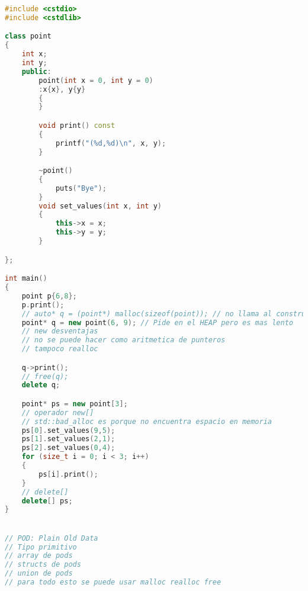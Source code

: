 \begin{lstlisting}[language=C++, caption={Herencia 2}]
#include <cstdio>
#include <cstdlib>

class point
{
    int x;
    int y;
    public:
        point(int x = 0, int y = 0)
        :x{x}, y{y}
        {
        }

        void print() const
        {
            printf("(%d,%d)\n", x, y);
        }

        ~point()
        {
            puts("Bye");
        }
        void set_values(int x, int y)
        {
            this->x = x;
            this->y = y;
        }

};

int main()
{
    point p{6,8};
    p.print();
    // auto* q = (point*) malloc(sizeof(point)); // no llama al constructor por lo que no sirve
    point* q = new point(6, 9); // Pide en el HEAP pero es mas lento
    // new desventajas
    // no se puede hacer como aritmetica de punteros
    // tampoco realloc

    q->print();
    // free(q);
    delete q;

    point* ps = new point[3];
    // operador new[]
    // std::bad_alloc es porque no encuentra espacio en memoria
    ps[0].set_values(9,5);
    ps[1].set_values(2,1);
    ps[2].set_values(0,4);
    for (size_t i = 0; i < 3; i++)
    {
        ps[i].print();
    }
    // delete[]
    delete[] ps;
}


// POD: Plain Old Data
// Tipo primitivo
// array de pods
// structs de pods
// union de pods
// para todo esto se puede usar malloc realloc free
\end{lstlisting}

